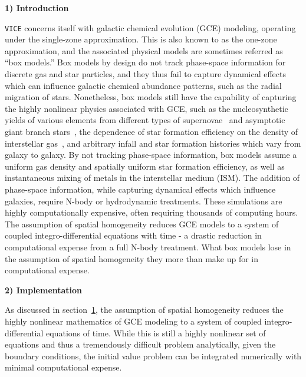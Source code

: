 \documentclass{report}
\begin{document}
\noindent
\hypertarget{sec:intro}{\textbf{1) Introduction}} \par\noindent
\texttt{VICE} concerns itself with galactic chemical evolution (GCE) modeling, 
operating under the single-zone approximation. This is also known to as the 
one-zone approximation, and the associated physical models are sometimes 
referred as ``box models.'' Box models by design do not track phase-space 
information for discrete gas and star 
particles, and they thus fail to capture dynamical effects which can influence 
galactic chemical abundance patterns, such as the radial migration of stars. 
Nonetheless, box models still have the capability of capturing the highly 
nonlinear physics associated with GCE, such as the nucleosynthetic yields of 
various elements from different types of 
supernovae~\citep[e.g.][]{Woosley1995,Iwamoto1999,Chieffi2004,Chieffi2013,
Limongi2018} and asymptotic giant branch stars~\citep[e.g.][]{Karakas2010, 
Cristallo2011}, the dependence of star formation efficiency on the density of 
interstellar gas~\citep[e.g.][]{Schmidt1959,Kennicutt1998,Leroy2008}, and 
arbitrary infall and star formation histories which vary from galaxy to 
galaxy. By not tracking phase-space information, box models assume a uniform 
gas density and spatially uniform star formation efficiency, as well as 
instantaneous mixing of metals in the interstellar medium (ISM). The addition 
of phase-space information, while capturing dynamical effects which influence 
galaxies, require N-body or hydrodynamic treatments. These simulations are 
highly computationally expensive, often requiring thousands of computing hours. 
The assumption of spatial homogeneity reduces GCE models to a system of 
coupled integro-differential equations with time - a drastic reduction in 
computational expense from a full N-body treatment. What box models lose in 
the assumption of spatial homogeneity they more than make up for in 
computational expense. 
\par\null\par
\noindent
\hypertarget{sec:implementation}{\textbf{2) Implementation}} \par\noindent
As discussed in section~\hyperlink{sec:intro}{1}, 
the assumption of spatial homogeneity reduces the highly nonlinear mathematics 
of GCE modeling to a system of coupled integro-differential equations of time. 
While this is still a highly nonlinear set of equations and thus a tremendously 
difficult problem analytically, given the boundary conditions, the initial 
value problem can be integrated numerically with minimal computational expense. 
\end{document}
